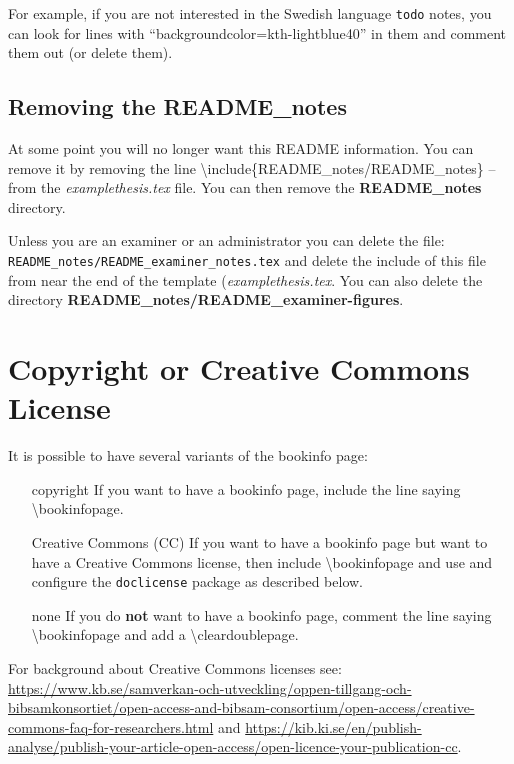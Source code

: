 \documentclass[examplethesis.tex]{subfiles}
\begin{document}
For example, if you are not interested in the Swedish language \texttt{todo} notes, you can look for lines with ``backgroundcolor=kth-lightblue40'' in them and comment them out (or delete them).

\subsection{Removing the README\_notes}
At some point you will no longer want this README information. You can remove it by removing the line
\textbackslash include\{README\_notes/README\_notes\} -- from the \textit{examplethesis.tex} file. You can then remove the \textbf{README\_notes} directory.

Unless you are an examiner or an administrator you can delete the file: \texttt{README\_notes/README\_examiner\_notes.tex} and delete the include of this file from near the end of the template (\ie \textit{examplethesis.tex}. You can also delete the directory \textbf{README\_notes/README\_examiner-figures}.


\section[Copyright or Creative Commons License]{Copyright or Creative Commons\\ License}
\label{sec:copyrightOrCClicense}
It is possible to have several variants of the bookinfo page:
\begin{enumerate}[labelwidth =\widthof{\textbf{Creative Commons (CC)}}, leftmargin = !]
    \item[copyright] If you want to have a bookinfo page, include the line saying \textbackslash bookinfopage.
    \item[Creative Commons (CC)] If you want to have a bookinfo page but want to have a Creative Commons license, then include \textbackslash bookinfopage and use and configure the \texttt{doclicense} package as described below.
    \item[none] If you do \textbf{not} want to have a bookinfo page, comment the line saying \textbackslash bookinfopage and add a \textbackslash cleardoublepage.
\end{enumerate}

For background about Creative Commons licenses see:
\url{https://www.kb.se/samverkan-och-utveckling/oppen-tillgang-och-bibsamkonsortiet/open-access-and-bibsam-consortium/open-access/creative-commons-faq-for-researchers.html} and \url{https://kib.ki.se/en/publish-analyse/publish-your-article-open-access/open-licence-your-publication-cc}.
\end{document}
